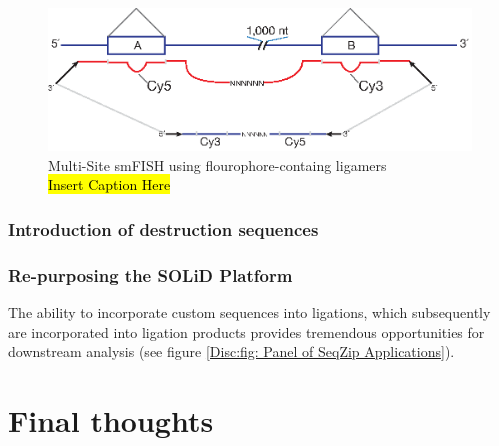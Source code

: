       \begin{figure} %
        \centering 
        \includegraphics{Figures/Discussion/MultiSiteFish.eps}
        \caption[Multi-Site smFISH using flourophore-containg ligamers]
        {Multi-Site smFISH using flourophore-containg ligamers \\[0.25cm]
          \hl{Insert Caption Here}
          }
        \label{Disc:fig:MultiSite FISH using SeqZip}
        \end{figure}


    \subsubsection{Introduction of destruction sequences}
      \label{Disc:subsubsec:Intro of Desctruction Sequences}


    \subsubsection{Re-purposing the SOLiD Platform}
      \label{Disc:subsubsec:SOLiD Platform for SeqZip}

      The ability to incorporate custom sequences into ligations, which subsequently are incorporated into ligation products provides tremendous opportunities for downstream analysis (see figure \ref{Disc:fig: Panel of SeqZip Applications}).


\section{Final thoughts}
  \label{Disc:sec:Final Thoughts}


